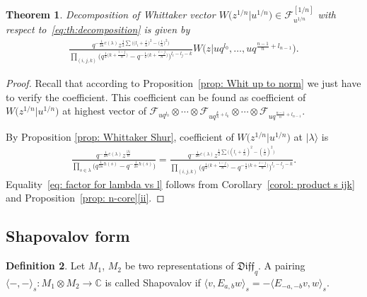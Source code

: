 \documentclass[pdftex]{sigma}
\numberwithin{equation}{section}
\newtheorem{Theorem}{Theorem}[section]
\theoremstyle{definition}
\newtheorem{Definition}[Theorem]{Definition}
\newcommand{\qD}{\mathfrak{Diff}_q}
\begin{document}
\begin{Theorem} \label{th: Whit decomposition}
Decomposition of Whittaker vector $W\big(z^{1/n}|u^{1/n}\big) \in \mathcal{F}^{[1/n]}_{u^{1/n}}$ with respect to~\eqref{eq:th:decomposition} is given by
\begin{gather*}
\frac{q^{-\frac{1}{2n} c(\lambda)} z^{\frac12 \sum \big( \big(l_i + \frac{i}{n}\big)^2 - \big(\frac{i}{n}\big)^2 \big) }}{ \prod\limits_{(i,j,k)} \Big(q^{\frac12 \big(k+\frac{i-j}{n} \big)}-q^{-\frac12 \big(k+\frac{i-j}{n} \big)}\Big)^{l_i-l_j-k} } W\big(z | u q^{ l_0}, \dots ,u q^{\frac{n-1}{n}+ l_{n-1}}\big).
\end{gather*}
\end{Theorem}

\begin{proof}
Recall that according to Proposition~\ref{prop: Whit up to norm} we just have to verify the coefficient. This coefficient can be found as coefficient of $W\big(z^{1/n}|u^{1/n}\big)$ at highest vector of $\mathcal{F}_{u q^{ l_0}} \otimes \cdots \otimes \mathcal{F}_{u q^{\frac{k}{n}+ l_k }} \otimes \cdots \otimes \mathcal{F}_{u q^{\frac{n-1}{n}+ l_{n-1}}}$.

By Proposition \ref{prop: Whittaker Shur}, coefficient of $W\big(z^{1/n}|u^{1/n}\big)$ at $| \lambda \rangle$ is
\begin{gather} \label{eq: factor for lambda vs l}
\frac{q^{-\frac{1}{2n} c(\lambda)} z^{\frac{| \lambda |}{n} } }{\prod\limits_{s\in\lambda}\big(q^{\frac{1}{2n}h(s)}-q^{-\frac{1}{2n}h(s)}\big)} = \frac{q^{-\frac{1}{2n} c(\lambda)} z^{\frac12 \sum \big( (l_i + \frac{i}{n})^2 - (\frac{i}{n})^2 \big) } }{ \prod\limits_{(i,j,k)} \Big(q^{\frac12 \big(k+\frac{i-j}{n} \big)}-q^{-\frac12 \big(k+\frac{i-j}{n} \big)}\Big)^{l_i-l_j-k} }. \end{gather}
Equality~\eqref{eq: factor for lambda vs l} follows from Corollary~\ref{corol: product s ijk} and Proposition~\ref{prop: n-core}\eqref{ii}.
\end{proof}

\subsection{Shapovalov form}

\begin{Definition}
Let $M_1$, $M_2$ be two representations of $\qD$. A pairing $\langle-,-\rangle_s\colon M_1 \otimes M_2 \rightarrow \mathbb{C}$ is called Shapovalov if $\langle v, E_{a, b}w \rangle_s = -\langle E_{-a,-b}v, w \rangle_s$.
\end{Definition}
\end{document}
